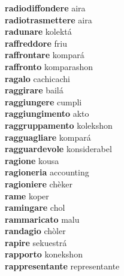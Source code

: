 \textbf{radiodiffondere } aira \\
\textbf{radiotrasmettere } aira \\
\textbf{radunare } kolektá \\
\textbf{raffreddore } friu \\
\textbf{raffrontare } kompará \\
\textbf{raffronto } komparashon \\
\textbf{ragalo } cachicachi \\
\textbf{raggirare } bailá \\
\textbf{raggiungere } cumpli \\
\textbf{raggiungimento } akto \\
\textbf{raggruppamento } kolekshon \\
\textbf{ragguagliare } kompará \\
\textbf{ragguardevole } konsiderabel \\
\textbf{ragione } kousa \\
\textbf{ragioneria } accounting \\
\textbf{ragioniere } chèker \\
\textbf{rame } koper \\
\textbf{ramingare } chol \\
\textbf{rammaricato } malu \\
\textbf{randagio } chòler \\
\textbf{rapire } sekuestrá \\
\textbf{rapporto } konekshon \\
\textbf{rappresentante } representante \\

